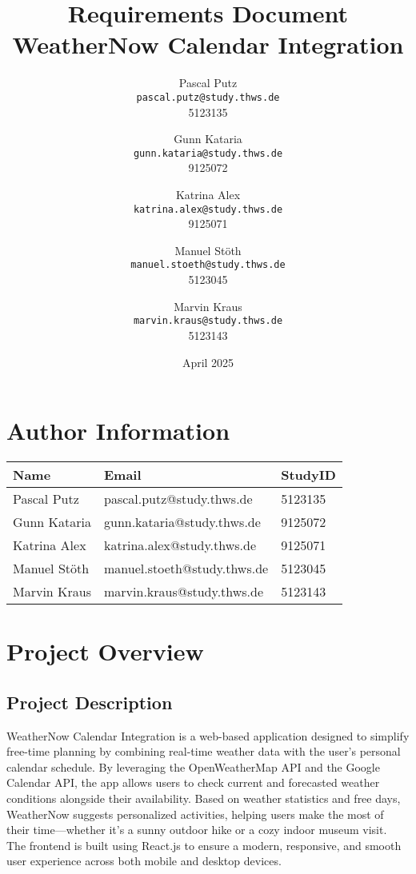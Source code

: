 \documentclass[12pt,a4paper]{article}
\title{Requirements Document\\\large WeatherNow Calendar Integration}
\author{
  Pascal Putz \\ \texttt{pascal.putz@study.thws.de} \\ 5123135
  \and
  Gunn Kataria \\ \texttt{gunn.kataria@study.thws.de} \\ 9125072
  \and
  Katrina Alex \\ \texttt{katrina.alex@study.thws.de} \\ 9125071
  \and
  Manuel Stöth \\ \texttt{manuel.stoeth@study.thws.de} \\ 5123045
  \and
  Marvin Kraus \\ \texttt{marvin.kraus@study.thws.de} \\ 5123143
  \and
}
\date{April 2025}
\begin{document}
\maketitle

\section{Author Information}
\begin{longtable}{|p{5cm}|p{6cm}|p{3cm}|}
\hline
\textbf{Name} & \textbf{Email} & \textbf{StudyID} \\
\hline
Pascal Putz & pascal.putz@study.thws.de & 5123135 \\
\hline
Gunn Kataria & gunn.kataria@study.thws.de & 9125072 \\
\hline
Katrina Alex & katrina.alex@study.thws.de & 9125071 \\
\hline
Manuel Stöth & manuel.stoeth@study.thws.de & 5123045 \\
\hline
Marvin Kraus & marvin.kraus@study.thws.de & 5123143 \\
\hline
\end{longtable}


\section{Project Overview}

\subsection{Project Description}
WeatherNow Calendar Integration is a web-based application designed to simplify free-time planning by combining real-time weather data with the user’s personal calendar schedule. By leveraging the OpenWeatherMap API and the Google Calendar API, the app allows users to check current and forecasted weather conditions alongside their availability. Based on weather statistics and free days, WeatherNow suggests personalized activities, helping users make the most of their time—whether it’s a sunny outdoor hike or a cozy indoor museum visit. The frontend is built using React.js to ensure a modern, responsive, and smooth user experience across both mobile and desktop devices.
\end{document}
